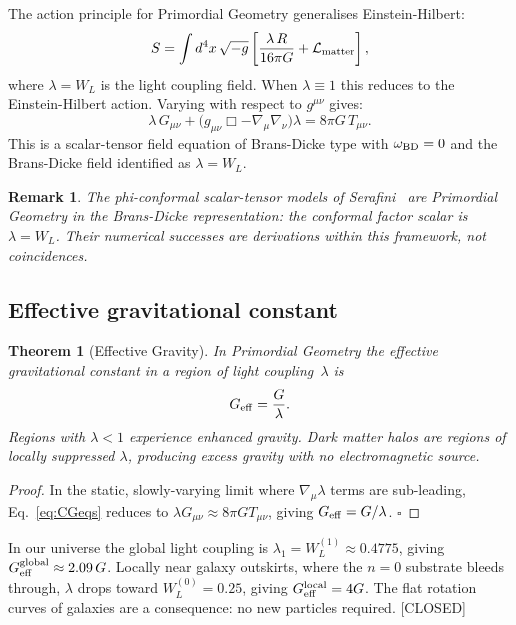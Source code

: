 \documentclass[prd,twocolumn,preprintnumbers,amsmath,amssymb]{revtex4-2}
\newtheorem{theorem}{Theorem}
\newtheorem{remark}{Remark}
\newcommand{\closed}{\textcolor{green!60!black}{[CLOSED]}}
\newcommand{\WL}{W_{L}}
\begin{document}
The action principle for Primordial Geometry generalises Einstein-Hilbert:
\begin{equation}
  S = \int d^4x\,\sqrt{-g}
      \left[\frac{\lambda\, R}{16\pi G} + \mathcal{L}_{\rm matter}\right],
  \label{eq:action}
\end{equation}
where $\lambda = \WL$ is the light coupling field.  When $\lambda\equiv1$ this
reduces to the Einstein-Hilbert action.  Varying with respect to $g^{\mu\nu}$
gives:
\begin{equation}
  \lambda\, G_{\mu\nu}
  + \bigl(g_{\mu\nu}\Box - \nabla_\mu\nabla_\nu\bigr)\lambda
  = 8\pi G\, T_{\mu\nu}.
  \label{eq:CGeqs}
\end{equation}
This is a scalar-tensor field equation of Brans-Dicke type with $\omega_{\rm
BD}=0$ and the Brans-Dicke field identified as $\lambda = \WL$.

\begin{remark}
The phi-conformal scalar-tensor models of Serafini~\cite{Serafini2026a} are
Primordial Geometry in the Brans-Dicke representation: the conformal factor scalar
is $\lambda = \WL$.  Their numerical successes are derivations within this
framework, not coincidences.
\end{remark}

\subsection{Effective gravitational constant}

\begin{theorem}[Effective Gravity]
In Primordial Geometry the effective gravitational constant in a region of light
coupling~$\lambda$ is
\begin{equation}
  G_{\rm eff} = \frac{G}{\lambda}.
  \label{eq:Geff}
\end{equation}
Regions with $\lambda < 1$ experience enhanced gravity.  Dark matter halos are
regions of locally suppressed $\lambda$, producing excess gravity with no
electromagnetic source.
\end{theorem}
\begin{proof}
In the static, slowly-varying limit where $\nabla_\mu\lambda$ terms are
sub-leading, Eq.~\eqref{eq:CGeqs} reduces to $\lambda G_{\mu\nu} \approx 8\pi G
T_{\mu\nu}$, giving $G_{\rm eff} = G/\lambda$. \hfill$\square$
\end{proof}

In our universe the global light coupling is $\lambda_1 = \WL^{(1)} \approx
0.4775$, giving $G_{\rm eff}^{\rm global} \approx 2.09\,G$.  Locally near
galaxy outskirts, where the $n=0$ substrate bleeds through, $\lambda$ drops
toward $\WL^{(0)} = 0.25$, giving $G_{\rm eff}^{\rm local} = 4G$.  The flat
rotation curves of galaxies are a consequence: no new particles required.
\closed
\end{document}
